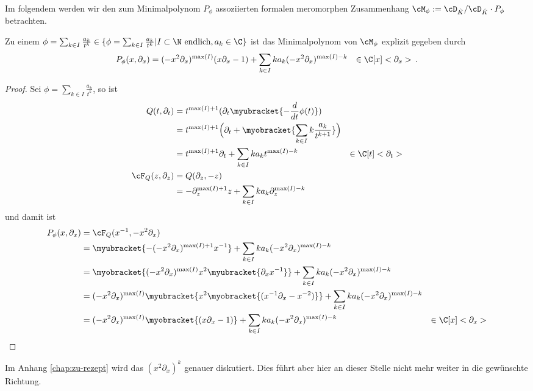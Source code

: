 Im folgendem werden wir den zum Minimalpolynom $P_\phi$ assoziierten formalen
meromorphen Zusammenhang $\cM_\phi:=\cD_{\hat K}/\cD_{\hat K}\cdot P_{\phi}$
betrachten.

\begin{lem}
Zu einem $\phi=\sum_{k\in I}\frac{a_k}{t^{k}}\in \{\phi=\sum_{k\in
I}\frac{a_k}{t^{k}}|I\subset\N\mbox{ endlich} ,a_k\in \C\}$ ist das
Minimalpolynom von $\cM_\phi$ explizit gegeben durch
\begin{align*}
P_{\phi}(x,\partial_x) &=(-x^2\partial_x)^{\max(I)} (x\partial_x-1)
   +\sum_{k\in I}k a_k(-x^2\partial_x)^{\max(I)-k} & \in \C[x]<\partial_x> \,.
\end{align*}
\end{lem}
\begin{proof}
Sei $\phi=\sum_{k\in I}\frac{a_k}{t^{k}}$, so ist
\begin{align*}
Q(t,\partial_t) &= t^{\max(I)+1}(\partial_t\myubracket{-\frac{d}{dt}\phi(t)})
\\&=t^{\max(I)+1}\Big(
    \partial_t+\myobracket{\sum_{k\in I} k\frac{a_k}{t^{k+1}}}\Big)
\\&=t^{\max(I)+1}\partial_t +\sum_{k\in I}k a_k t^{\max(I)-k}
  & \in \C[t]<\partial_t>
\\\cF_Q(z,\partial_z) &=Q(\partial_z,-z)
\\&=-\partial_z^{\max(I)+1}z +\sum_{k\in I}k a_k\partial_z^{\max(I)-k}
\end{align*}
und damit ist
\begin{align*}
P_{\phi}(x,\partial_x) &=\cF_Q(x^{-1},-x^2\partial_x)
\\&=\myubracket{-(-x^2\partial_x)^{\max(I)+1}x^{-1}}
  +\sum_{k\in I}k a_k(-x^2\partial_x)^{\max(I)-k}
\\&=\myobracket{(-x^2\partial_x)^{\max(I)} x^2\myubracket{\partial_xx^{-1}}}
   +\sum_{k\in I}k a_k(-x^2\partial_x)^{\max(I)-k}
\\&=(-x^2\partial_x)^{\max(I)}
   \myubracket{ x^2 \myobracket{(x^{-1}\partial_x-x^{-2})} }
   +\sum_{k\in I}k a_k(-x^2\partial_x)^{\max(I)-k}
\\&=(-x^2\partial_x)^{\max(I)} \myobracket{(x\partial_x-1)}
   +\sum_{k\in I}k a_k(-x^2\partial_x)^{\max(I)-k}
  & \in \C[x]<\partial_x>
\end{align*}
\end{proof}
Im Anhang \ref{chap:zu-rezept} wird das $(x^2\partial_x)^{k}$ genauer
diskutiert. Dies führt aber hier an dieser Stelle nicht mehr weiter in die
gewünschte Richtung.

